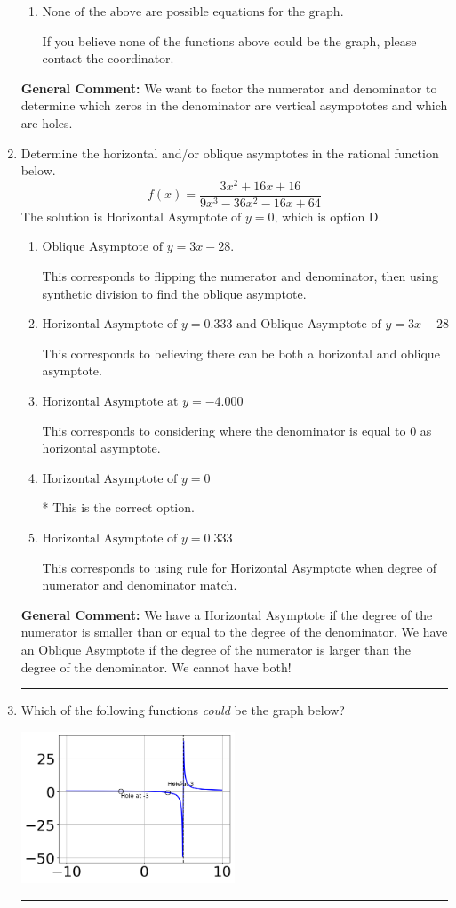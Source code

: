 \documentclass{extbook}[14pt]
\newcommand{\litem}[1]{\item #1

\rule{\textwidth}{0.4pt}}
\begin{document}
\begin{enumerate}
{\begin{enumerate}[label=\Alph*.]
Remember that factors are written as $x-z$. For example, the zero $x=1$ corresponds to the factor $x-(1)$.
\item \( \text{None of the above are possible equations for the graph.} \)

If you believe none of the functions above could be the graph, please contact the coordinator.
\end{enumerate}

\textbf{General Comment:} We want to factor the numerator and denominator to determine which zeros in the denominator are vertical asympototes and which are holes.
}
\litem{
Determine the horizontal and/or oblique asymptotes in the rational function below.
\[ f(x) = \frac{3x^{2} +16 x + 16}{9x^{3} -36 x^{2} -16 x + 64} \]The solution is \( \text{Horizontal Asymptote of } y = 0 \), which is option D.\begin{enumerate}[label=\Alph*.]
\item \( \text{Oblique Asymptote of } y = 3x -28. \)

This corresponds to flipping the numerator and denominator, then using synthetic division to find the oblique asymptote.
\item \( \text{Horizontal Asymptote of } y = 0.333 \text{ and Oblique Asymptote of } y = 3x -28 \)

This corresponds to believing there can be both a horizontal and oblique asymptote.
\item \( \text{Horizontal Asymptote at } y = -4.000 \)

This corresponds to considering where the denominator is equal to 0 as horizontal asymptote.
\item \( \text{Horizontal Asymptote of } y = 0 \)

* This is the correct option.
\item \( \text{Horizontal Asymptote of } y = 0.333  \)

This corresponds to using rule for Horizontal Asymptote when degree of numerator and denominator match.
\end{enumerate}

\textbf{General Comment:} We have a Horizontal Asymptote if the degree of the numerator is smaller than or equal to the degree of the denominator. We have an Oblique Asymptote if the degree of the numerator is larger than the degree of the denominator. We cannot have both!
}
\litem{
Which of the following functions \textit{could} be the graph below?

\begin{center}
    \includegraphics[width=0.5\textwidth]{../Figures/identifyGraphOfRationalFunctionA.png}
\end{center}


}
\end{enumerate}
\end{document}
